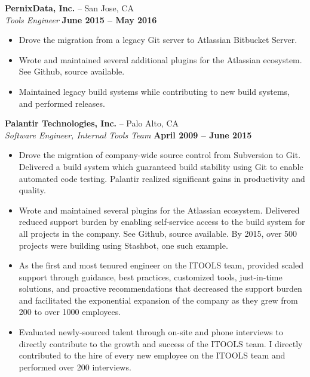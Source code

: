 \documentclass[line, margin]{res}
\begin{document}
\begin{resume}
{\bf PernixData, Inc.} -- San Jose, CA
\\
\textit{Tools Engineer} \hfill {\bf June 2015 -- May 2016}
\\
\begin{itemize}
\item
Drove the migration from a legacy Git server to Atlassian Bitbucket Server.
\item
Wrote and maintained several additional plugins for the Atlassian ecosystem.
See Github, source available.
\item
Maintained legacy build systems while contributing to new build systems, and performed releases.
\end{itemize}

{\bf Palantir Technologies, Inc.} -- Palo Alto, CA
\\
\textit{Software Engineer, Internal Tools Team} \hfill {\bf April 2009 -- June 2015}
\\
\begin{itemize}
\item
Drove the migration of company-wide source control from Subversion to Git.
Delivered a build system which guaranteed build stability using Git to enable automated
code testing.  Palantir realized significant gains in productivity and quality.
\item
Wrote and maintained several plugins for the Atlassian ecosystem.  Delivered
reduced support burden by enabling self-service access to the build system
for all projects in the company.  See Github, source available.
By 2015, over 500 projects were building using Stashbot, one such example.
\item
As the first and most tenured engineer on the ITOOLS team, provided scaled
support through guidance, best practices, customized tools, just-in-time
solutions, and proactive recommendations that decreased the support burden and
facilitated the exponential expansion of the company as they grew from 200 to
over 1000 employees.
\item
Evaluated newly-sourced talent through on-site and phone interviews to directly
contribute to the growth and success of the ITOOLS team.  I directly
contributed to the hire of every new employee on the ITOOLS team and performed
over 200 interviews.
\end{itemize}


\end{resume}
\end{document}
